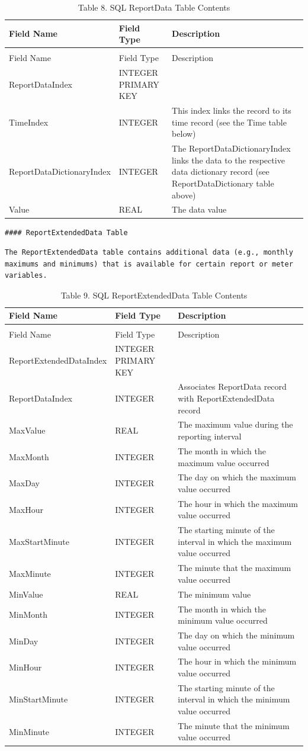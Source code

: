 \begin{longtable}[c]{p{1.5in}p{1.5in}p{3.0in}}
\caption{Table 8. SQL ReportData Table Contents \label{table:table-8.-sql-reportdata-table-contents}} \tabularnewline
\toprule 
Field Name & Field Type & Description \tabularnewline
\midrule
\endfirsthead

\caption[]{Table 8. SQL ReportData Table Contents} \tabularnewline
\toprule 
Field Name & Field Type & Description \tabularnewline
\midrule
\endhead

ReportDataIndex & INTEGER PRIMARY KEY &  \tabularnewline
TimeIndex & INTEGER & This index links the record to its time record (see the Time table below) \tabularnewline
ReportDataDictionaryIndex & INTEGER & The ReportDataDictionaryIndex links the data to the respective data dictionary record (see ReportDataDictionary table above) \tabularnewline
Value & REAL & The data value \tabularnewline
\bottomrule
\end{longtable}

\begin{lstlisting}
#### ReportExtendedData Table
\end{lstlisting}

\begin{lstlisting}
The ReportExtendedData table contains additional data (e.g., monthly maximums and minimums) that is available for certain report or meter variables.
\end{lstlisting}

\begin{longtable}[c]{p{1.5in}p{1.5in}p{3.0in}}
\caption{Table 9. SQL ReportExtendedData Table Contents \label{table:table-9.-sql-reportextendeddata-table}} \tabularnewline
\toprule 
Field Name & Field Type & Description \tabularnewline
\midrule
\endfirsthead

\caption[]{Table 9. SQL ReportExtendedData Table Contents} \tabularnewline
\toprule 
Field Name & Field Type & Description \tabularnewline
\midrule
\endhead

ReportExtendedDataIndex & INTEGER PRIMARY KEY &  \tabularnewline
ReportDataIndex & INTEGER & Associates ReportData record with ReportExtendedData record \tabularnewline
MaxValue & REAL & The maximum value during the reporting interval \tabularnewline
MaxMonth & INTEGER & The month in which the maximum value occurred \tabularnewline
MaxDay & INTEGER & The day on which the maximum value occurred \tabularnewline
MaxHour & INTEGER & The hour in which the maximum value occurred \tabularnewline
MaxStartMinute & INTEGER & The starting minute of the interval in which the maximum value occurred \tabularnewline
MaxMinute & INTEGER & The minute that the maximum value occurred \tabularnewline
MinValue & REAL & The minimum value \tabularnewline
MinMonth & INTEGER & The month in which the minimum value occurred \tabularnewline
MinDay & INTEGER & The day on which the minimum value occurred \tabularnewline
MinHour & INTEGER & The hour in which the minimum value occurred \tabularnewline
MinStartMinute & INTEGER & The starting minute of the interval in which the minimum value occurred \tabularnewline
MinMinute & INTEGER & The minute that the minimum value occurred \tabularnewline
\bottomrule
\end{longtable}

